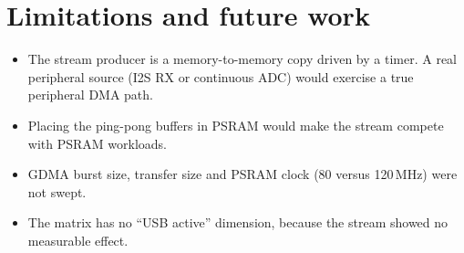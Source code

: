 \documentclass[11pt,a4paper]{article}
\begin{document}
\section{Limitations and future work}
\begin{itemize}
  \item The stream producer is a memory-to-memory copy driven by a timer. A real peripheral source
        (I2S RX or continuous ADC) would exercise a true peripheral DMA path.
  \item Placing the ping-pong buffers in PSRAM would make the stream compete with PSRAM workloads.
  \item GDMA burst size, transfer size and PSRAM clock (80 versus 120\,MHz) were not swept.
  \item The matrix has no ``USB active'' dimension, because the stream showed no measurable effect.
\end{itemize}
\end{document}

